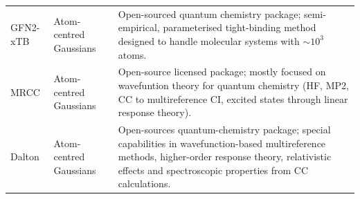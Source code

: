 \begin{longtable}{p{2cm}p{3cm}p{12.5cm}}
      \footnotesize{GFN2-xTB\cite{bannwarth2019gfn2}} 
            & \footnotesize{Atom-centred Gaussians}
            & \footnotesize{Open-sourced quantum chemistry package; semi-empirical, parameterised tight-binding method designed to handle molecular systems with $\sim 10^3$ atoms.}\\
            
      
      \footnotesize{MRCC\cite{mrcc_1,mrcc_2}} 
        & \footnotesize{Atom-centred Gaussians}
        & \footnotesize{Open-source licensed package; mostly focused on wavefuntion theory for quantum chemistry (HF, MP2, CC to multireference CI, excited states through linear response theory).}\\
      
      \footnotesize{Dalton\cite{dalton_package_2,dalton_package}} 
            & \footnotesize{Atom-centred Gaussians}
            &  \footnotesize{Open-sources quantum-chemistry package; special capabilities in wavefunction-based multireference methods, higher-order response theory, relativistic effects and spectroscopic properties from CC calculations.}\\


\end{longtable}
\endgroup




